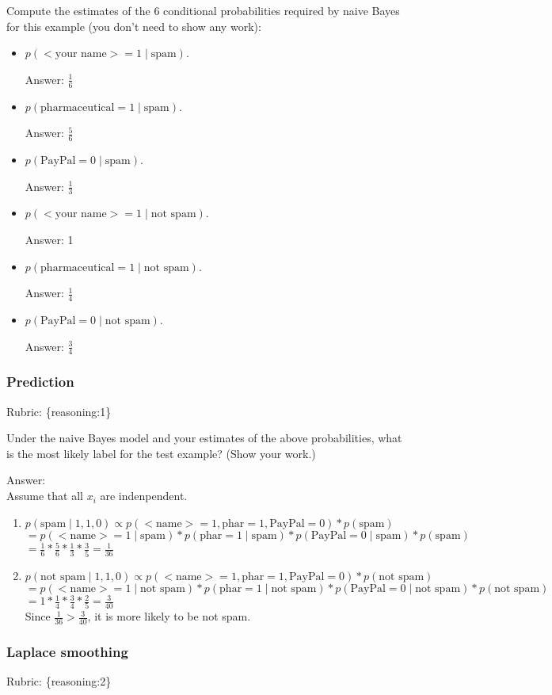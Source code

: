\documentclass{article}
\def\rubric#1{\gre{Rubric: \{#1\}}}{}
\def\ans#1{\par\gre{Answer: #1}}
\def\blu#1{{\color{blu}#1}}
\def\gre#1{{\color{gre}#1}}
\def\cond{\; | \;}
\def\items#1{\begin{itemize}#1\end{itemize}}
\def\enum#1{\begin{enumerate}#1\end{enumerate}}
\begin{document}
\blu{Compute the estimates of the 6 conditional probabilities required by naive Bayes for this example}  (you don't need to show any work):
\items{
\item $p(\text{$<$your name$>$} = 1  \cond \text{spam})$.
\ans{$\frac{1}{6}$}
\item $p(\text{pharmaceutical} = 1 \cond \text{spam})$.
\ans{$\frac{5}{6}$}
\item $p(\text{PayPal} = 0  \cond \text{spam})$.
\ans{$\frac{1}{3}$}
\item $p(\text{$<$your name$>$} = 1  \cond \text{not spam})$.
\ans{1}
\item $p(\text{pharmaceutical} = 1  \cond \text{not spam})$.
\ans{$\frac{1}{4}$}
\item $p(\text{PayPal} = 0  \cond \text{not spam})$.
\ans{$\frac{3}{4}$}
}

\subsubsection{Prediction}
\rubric{reasoning:1}

\blu{Under the naive Bayes model and your estimates of the above probabilities, what is the most likely label for the test example? (Show your work.)}
\ans{
	\\Assume that all $x_i$ are indenpendent.
	\enum{
		\item  $p( \text{spam}\cond 1,1,0) \propto 
		p(\text{$<$name$>$} = 1,\text{phar} = 1, \text{PayPal} = 0 ) *p(\text{spam})$
		\\$= 
		p(\text{$<$name$>$} = 1  \cond \text{spam})*p(\text{phar} = 1 \cond \text{spam})*p(\text{PayPal} = 0  \cond \text{spam})*p(\text{spam})$
		\\$= 
		\frac{1}{6}*\frac{5}{6}*\frac{1}{3}*\frac{3}{5}=
		\frac{1}{36}$
		\item  $p( \text{not spam}\cond 1,1,0) \propto  
		p(\text{$<$name$>$} = 1,\text{phar} = 1, \text{PayPal} = 0 ) *p(\text{not spam})$
		\\$= p(\text{$<$name$>$} = 1  \cond \text{not spam})*p(\text{phar} = 1 \cond \text{not spam})*p(\text{PayPal} = 0  \cond \text{not spam})*p(\text{not spam})$
		\\$= 1*\frac{1}{4}*\frac{3}{4}*\frac{2}{5}=
		\frac{3}{40}$
		\\ Since $\frac{1}{36} > \frac{3}{40}$, it is more likely to be not spam.
	}
}
\subsubsection{Laplace smoothing}
\label{laplace.conceptual}
\rubric{reasoning:2}
\end{document}
